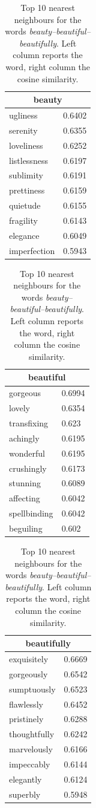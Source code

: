 \begin{table}[tbh]
\myfloatalign
\small
\begin{tabular}{ll}
\toprule
\multicolumn{2}{c}{beauty}\\ \midrule
	ugliness & 0.6402 \\
	serenity & 0.6355 \\
	loveliness & 0.6252 \\
	listlessness & 0.6197 \\
	sublimity & 0.6191 \\
	prettiness & 0.6159 \\
	quietude & 0.6155 \\
	fragility & 0.6143 \\
	elegance & 0.6049 \\
	imperfection & 0.5943 \\
	\bottomrule
\end{tabular}
\begin{tabular}{ll}
\toprule
\multicolumn{2}{c}{beautiful}\\ \midrule
	gorgeous & 0.6994 \\
	lovely & 0.6354 \\
	transfixing & 0.623 \\
	achingly & 0.6195 \\
	wonderful & 0.6195 \\
	crushingly & 0.6173 \\
	stunning & 0.6089 \\
	affecting & 0.6042 \\
	spellbinding & 0.6042 \\
	beguiling & 0.602 \\
	\bottomrule
\end{tabular}
\begin{tabular}{ll}
\toprule
\multicolumn{2}{c}{beautifully}\\ \midrule
	exquisitely & 0.6669 \\
	gorgeously & 0.6542 \\
	sumptuously & 0.6523\\ 
	flawlessly & 0.6452\\
	pristinely & 0.6288\\
	thoughtfully & 0.6242\\
	marvelously & 0.6166\\
	impeccably & 0.6144 \\
	elegantly & 0.6124\\
	superbly & 0.5948\\
\bottomrule
\end{tabular}
\caption[Nearest neighbours for \emph{beauty-beautiful-beautifully}]{Top 10 nearest neighbours for the words \emph{beauty--beautiful--beautifully}. Left column reports the word, right column the cosine similarity.}
\label{tab:beauty10nearest}
\end{table}

